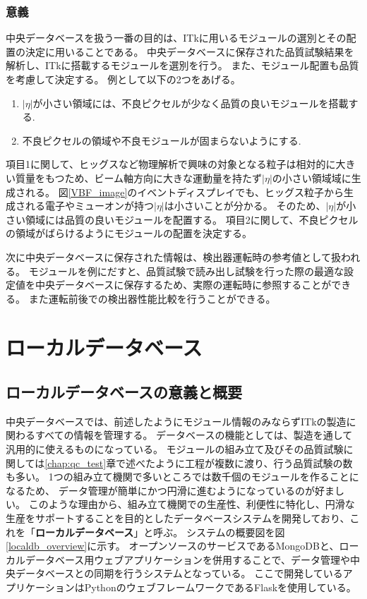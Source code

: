 \subsubsection{意義}
中央データベースを扱う一番の目的は、ITkに用いるモジュールの選別とその配置の決定に用いることである。
中央データベースに保存された品質試験結果を解析し、ITkに搭載するモジュールを選別を行う。
また、モジュール配置も品質を考慮して決定する。
例として以下の2つをあげる。
\begin{enumerate}
  \item $|\eta|$が小さい領域には、不良ピクセルが少なく品質の良いモジュールを搭載する.
  \item 不良ピクセルの領域や不良モジュールが固まらないようにする.
\end{enumerate}
項目1に関して、ヒッグスなど物理解析で興味の対象となる粒子は相対的に大きい質量をもつため、ビーム軸方向に大きな運動量を持たず$|\eta|$の小さい領域域に生成される。
図\ref{VBF_image}のイベントディスプレイでも、ヒッグス粒子から生成される電子やミューオンが持つ$|\eta|$は小さいことが分かる。
そのため、$|\eta|$が小さい領域には品質の良いモジュールを配置する。
項目2に関して、不良ピクセルの領域がばらけるようにモジュールの配置を決定する。


次に中央データベースに保存された情報は、検出器運転時の参考値として扱われる。
モジュールを例にだすと、品質試験で読み出し試験を行った際の最適な設定値を中央データベースに保存するため、実際の運転時に参照することができる。
また運転前後での検出器性能比較を行うことができる。

\section{ローカルデータベース}
\subsection{ローカルデータベースの意義と概要}
中央データベースでは、前述したようにモジュール情報のみならずITkの製造に関わるすべての情報を管理する。
データベースの機能としては、製造を通して汎用的に使えるものになっている。
モジュールの組み立て及びその品質試験に関しては\ref{chap:qc_test}章で述べたように工程が複数に渡り、行う品質試験の数も多い。
1つの組み立て機関で多いところでは数千個のモジュールを作ることになるため、
データ管理が簡単にかつ円滑に進むようになっているのが好ましい。
このような理由から、組み立て機関での生産性、利便性に特化し、円滑な生産をサポートすることを目的としたデータベースシステムを開発しており、これを「\textbf{ローカルデータベース}」と呼ぶ。
システムの概要図を図\ref{localdb_overview}に示す。
オープンソースのサービスであるMongoDB\cite{4-1}と、ローカルデータベース用ウェブアプリケーションを併用することで、データ管理や中央データベースとの同期を行うシステムとなっている。
ここで開発しているアプリケーションはPythonのウェブフレームワークであるFlask\cite{4-3}を使用している。

